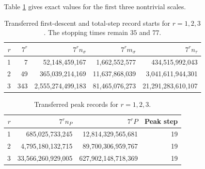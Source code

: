 \documentclass[11pt]{article}
\begin{document}
Table \ref{tab:r123records} gives exact values for the first three nontrivial scales.
\begin{table}[ht]
\centering
\small
\begin{tabular}{@{}r r r r r@{}}
\toprule
$r$ & $7^r$ & $7^rn_\sigma$ & $7^rm_\sigma$ & $7^rn_\tau$ \\
\midrule
1 & 7 & 52,148,459,167 & 1,662,552,577 & 434,515,992,043 \\
2 & 49 & 365,039,214,169 & 11,637,868,039 & 3,041,611,944,301 \\
3 & 343 & 2,555,274,499,183 & 81,465,076,273 & 21,291,283,610,107 \\
\bottomrule
\end{tabular}
\caption{Transferred first-descent and total-step record starts for $r=1,2,3$. The stopping times remain $35$ and $77$.}
\label{tab:r123records}
\end{table}

\begin{table}[ht]
\centering
\small
\begin{tabular}{@{}r r r r@{}}
\toprule
$r$ & $7^rn_P$ & $7^rP$ & Peak step \\
\midrule
1 & 685,025,733,245 & 12,814,329,565,681 & 19 \\
2 & 4,795,180,132,715 & 89,700,306,959,767 & 19 \\
3 & 33,566,260,929,005 & 627,902,148,718,369 & 19 \\
\bottomrule
\end{tabular}
\caption{Transferred peak records for $r=1,2,3$.}
\label{tab:r123peaks}
\end{table}
\end{document}
